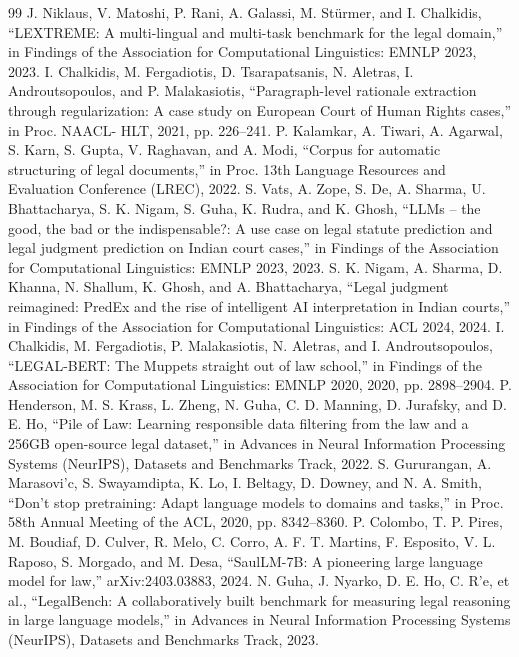 \begin{thebibliography}{99}
 J. Niklaus, V. Matoshi, P. Rani, A. Galassi, M. St\"urmer, and I. Chalkidis, ``LEXTREME: A multi-lingual and multi-task benchmark for the legal domain,'' in Findings of the Association for Computational Linguistics: EMNLP 2023, 2023.
 I. Chalkidis, M. Fergadiotis, D. Tsarapatsanis, N. Aletras, I. Androutsopoulos, and P. Malakasiotis, ``Paragraph-level rationale extraction through regularization: A case study on European Court of Human Rights cases,'' in Proc. NAACL- HLT, 2021, pp. 226--241.
 P. Kalamkar, A. Tiwari, A. Agarwal, S. Karn, S. Gupta, V. Raghavan, and A. Modi, ``Corpus for automatic structuring of legal documents,'' in Proc. 13th Language Resources and Evaluation Conference (LREC), 2022.
 S. Vats, A. Zope, S. De, A. Sharma, U. Bhattacharya, S. K. Nigam, S. Guha, K. Rudra, and K. Ghosh, ``LLMs -- the good, the bad or the indispensable?: A use case on legal statute prediction and legal judgment prediction on Indian court cases,'' in Findings of the Association for Computational Linguistics: EMNLP 2023, 2023.
 S. K. Nigam, A. Sharma, D. Khanna, N. Shallum, K. Ghosh, and A. Bhattacharya, ``Legal judgment reimagined: PredEx and the rise of intelligent AI interpretation in Indian courts,'' in Findings of the Association for Computational Linguistics: ACL 2024, 2024.
 I. Chalkidis, M. Fergadiotis, P. Malakasiotis, N. Aletras, and I. Androutsopoulos, ``LEGAL-BERT: The Muppets straight out of law school,'' in Findings of the Association for Computational Linguistics: EMNLP 2020, 2020, pp. 2898--2904.
 P. Henderson, M. S. Krass, L. Zheng, N. Guha, C. D. Manning, D. Jurafsky, and D. E. Ho, ``Pile of Law: Learning responsible data filtering from the law and a 256GB open-source legal dataset,'' in Advances in Neural Information Processing Systems (NeurIPS), Datasets and Benchmarks Track, 2022.
 S. Gururangan, A. Marasovi'c, S. Swayamdipta, K. Lo, I. Beltagy, D. Downey, and N. A. Smith, ``Don't stop pretraining: Adapt language models to domains and tasks,'' in Proc. 58th Annual Meeting of the ACL, 2020, pp. 8342--8360.
 P. Colombo, T. P. Pires, M. Boudiaf, D. Culver, R. Melo, C. Corro, A. F. T. Martins, F. Esposito, V. L. Raposo, S. Morgado, and M. Desa, ``SaulLM-7B: A pioneering large language model for law,'' arXiv:2403.03883, 2024.
 N. Guha, J. Nyarko, D. E. Ho, C. R'e, et al., ``LegalBench: A collaboratively built benchmark for measuring legal reasoning in large language models,'' in Advances in Neural Information Processing Systems (NeurIPS), Datasets and Benchmarks Track, 2023.

\end{thebibliography}
